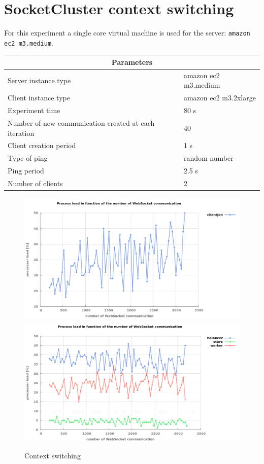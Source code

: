 
\section{SocketCluster context switching}

For this experiment a single core  virtual machine is used for the server:
\texttt{amazon ec2 m3.medium}.

\begin{center}
  \begin{tabular}{ | l | l |}
  \hline
  \multicolumn{2}{|c|}{Parameters} \\
  \hline
    Server instance type &  amazon ec2 m3.medium\\ 
    Client instance type &  amazon ec2 m3.2xlarge\\
    Experiment time & 80 s \\
    Number of new communication created at each iteration & 40 \\
    Client creation period & 1 s \\
    Type of ping & random number \\ 
    Ping period & 2.5 s \\ 
    Number of clients & 2 \\
  \hline
  \end{tabular}
\end{center}

\begin{figure}[H]
	\centering
		\includegraphics[width=\textwidth]{./Figures/WS_client_context.png}
		\includegraphics[width=\textwidth]{./Figures/WS_server_context.png}
	\caption[Contexting switching]{Context switching}
	\label{fig:context}
\end{figure}

